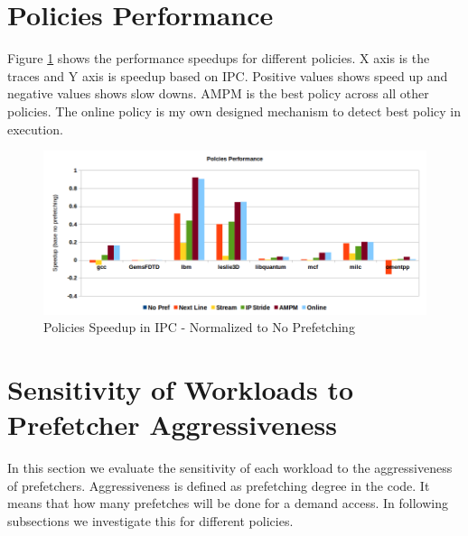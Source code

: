 \documentclass{article}
\begin{document}
\section{Policies Performance}
Figure \ref{pic:perf} shows the performance speedups for different policies. X axis is the traces and Y axis is speedup based on IPC. Positive values shows speed up and negative values shows slow downs. AMPM is the best policy across all other policies. The online policy is my own designed mechanism to detect best policy in execution. 

\begin{figure}[h!]
  \label{pic:perf}
  \centering
    \includegraphics[width=1\textwidth]{perf.png}
    \caption{Policies Speedup in IPC - Normalized to No Prefetching}
\end{figure}

\section{Sensitivity of Workloads to Prefetcher Aggressiveness}
In this section we evaluate the sensitivity of each workload to the aggressiveness of prefetchers. Aggressiveness is defined as prefetching degree in the code. It means that how many prefetches will be done for a demand access. In following subsections we investigate this for different policies.
\end{document}
